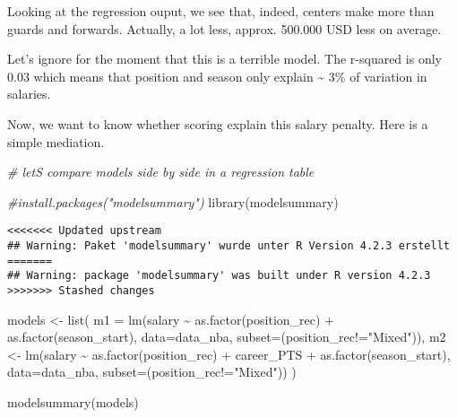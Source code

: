 \documentclass[
]{book}
\newenvironment{Shaded}{\begin{snugshade}}{\end{snugshade}}
\newcommand{\AttributeTok}[1]{\textcolor[rgb]{0.77,0.63,0.00}{#1}}
\newcommand{\AttributeTok}[1]{\textcolor[rgb]{0.13,0.29,0.53}{#1}}
\newcommand{\CommentTok}[1]{\textcolor[rgb]{0.56,0.35,0.01}{\textit{#1}}}
\newcommand{\FunctionTok}[1]{\textcolor[rgb]{0.00,0.00,0.00}{#1}}
\newcommand{\FunctionTok}[1]{\textcolor[rgb]{0.13,0.29,0.53}{\textbf{#1}}}
\newcommand{\NormalTok}[1]{#1}
\newcommand{\OtherTok}[1]{\textcolor[rgb]{0.56,0.35,0.01}{#1}}
\newcommand{\SpecialCharTok}[1]{\textcolor[rgb]{0.00,0.00,0.00}{#1}}
\newcommand{\SpecialCharTok}[1]{\textcolor[rgb]{0.81,0.36,0.00}{\textbf{#1}}}
\newcommand{\StringTok}[1]{\textcolor[rgb]{0.31,0.60,0.02}{#1}}
\begin{document}
Looking at the regression ouput, we see that, indeed, centers make more than guards and forwards. Actually, a lot less, approx. 500.000 USD less on average.

Let's ignore for the moment that this is a terrible model. The r-squared is only 0.03 which means that position and season only explain \textasciitilde{} 3\% of variation in salaries.

Now, we want to know whether scoring explain this salary penalty. Here is a simple mediation.

\begin{Shaded}
\begin{Highlighting}[]
\CommentTok{\# let\textquotesingle{}S compare models side by side in a regression table}

\CommentTok{\#install.packages("modelsummary")}
\FunctionTok{library}\NormalTok{(modelsummary)}
\end{Highlighting}
\end{Shaded}

\begin{verbatim}
<<<<<<< Updated upstream
## Warning: Paket 'modelsummary' wurde unter R Version 4.2.3 erstellt
=======
## Warning: package 'modelsummary' was built under R version 4.2.3
>>>>>>> Stashed changes
\end{verbatim}

\begin{Shaded}
\begin{Highlighting}[]
\NormalTok{models }\OtherTok{\textless{}{-}} \FunctionTok{list}\NormalTok{(}
  \AttributeTok{m1 =} \FunctionTok{lm}\NormalTok{(salary }\SpecialCharTok{\textasciitilde{}} \FunctionTok{as.factor}\NormalTok{(position\_rec) }\SpecialCharTok{+} \FunctionTok{as.factor}\NormalTok{(season\_start), }\AttributeTok{data=}\NormalTok{data\_nba, }\AttributeTok{subset=}\NormalTok{(position\_rec}\SpecialCharTok{!=}\StringTok{"Mixed"}\NormalTok{)),}
\NormalTok{  m2 }\OtherTok{\textless{}{-}} \FunctionTok{lm}\NormalTok{(salary }\SpecialCharTok{\textasciitilde{}} \FunctionTok{as.factor}\NormalTok{(position\_rec) }\SpecialCharTok{+}\NormalTok{ career\_PTS }\SpecialCharTok{+} \FunctionTok{as.factor}\NormalTok{(season\_start), }\AttributeTok{data=}\NormalTok{data\_nba, }\AttributeTok{subset=}\NormalTok{(position\_rec}\SpecialCharTok{!=}\StringTok{"Mixed"}\NormalTok{))}
\NormalTok{)}

\FunctionTok{modelsummary}\NormalTok{(models)}
\end{Highlighting}
\end{Shaded}
\end{document}
